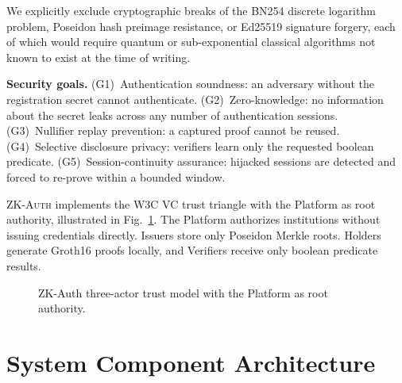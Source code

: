 \documentclass[12pt,a4paper,oneside]{report}
\begin{document}
We explicitly exclude cryptographic breaks of the BN254 discrete logarithm
problem, Poseidon hash preimage resistance, or Ed25519 signature forgery,
each of which would require quantum or sub-exponential classical
algorithms not known to exist at the time of writing.

\textbf{Security goals.} (G1)~Authentication soundness: an adversary
without the registration secret cannot authenticate. (G2)~Zero-knowledge:
no information about the secret leaks across any number of authentication
sessions. (G3)~Nullifier replay prevention: a captured proof cannot be
reused. (G4)~Selective disclosure privacy: verifiers learn only the
requested boolean predicate. (G5)~Session-continuity assurance: hijacked
sessions are detected and forced to re-prove within a bounded window.

\textsc{ZK-Auth} implements the W3C VC trust triangle with the Platform as
root authority, illustrated in Fig.~\ref{fig:trust_model}. The Platform
authorizes institutions without issuing credentials directly. Issuers
store only Poseidon Merkle roots. Holders generate Groth16 proofs locally,
and Verifiers receive only boolean predicate results.

\begin{figure}[htbp]
\centering
{}
\caption{ZK-Auth three-actor trust model with the Platform as root authority.}
\label{fig:trust_model}
\end{figure}

\section{System Component Architecture}
\end{document}
